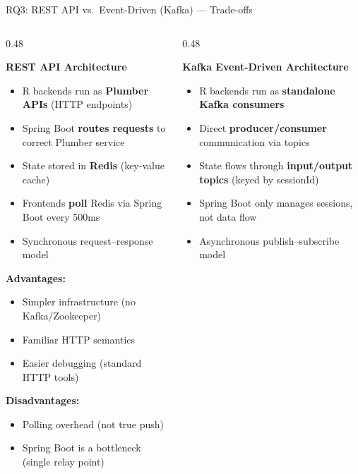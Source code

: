 \documentclass[aspectratio=169]{beamer}
\begin{document}
\begin{frame}{RQ3: REST API vs.\ Event-Driven (Kafka) --- Trade-offs}

\begin{columns}[T]
\begin{column}{0.48\textwidth}

\textbf{REST API Architecture}
\begin{itemize}
    \item R backends run as \textbf{Plumber APIs} (HTTP endpoints)
    \item Spring Boot \textbf{routes requests} to correct Plumber service
    \item State stored in \textbf{Redis} (key-value cache)
    \item Frontends \textbf{poll} Redis via Spring Boot every 500ms
    \item Synchronous request--response model
\end{itemize}

\vspace{0.5em}
\textbf{Advantages:}
\begin{itemize}
    \item[\textcolor{green!60!black}{\faCheck}] Simpler infrastructure (no Kafka/Zookeeper)
    \item[\textcolor{green!60!black}{\faCheck}] Familiar HTTP semantics
    \item[\textcolor{green!60!black}{\faCheck}] Easier debugging (standard HTTP tools)
\end{itemize}

\textbf{Disadvantages:}
\begin{itemize}
    \item[\textcolor{red}{\faTimes}] Polling overhead (not true push)
    \item[\textcolor{red}{\faTimes}] Spring Boot is a bottleneck (single relay point)
\end{itemize}

\end{column}
\begin{column}{0.48\textwidth}

\textbf{Kafka Event-Driven Architecture}
\begin{itemize}
    \item R backends run as \textbf{standalone Kafka consumers}
    \item Direct \textbf{producer/consumer} communication via topics
    \item State flows through \textbf{input/output topics} (keyed by sessionId)
    \item Spring Boot only manages sessions, not data flow
    \item Asynchronous publish--subscribe model
\end{itemize}


\end{column}
\end{columns}
\end{frame}
\end{document}

